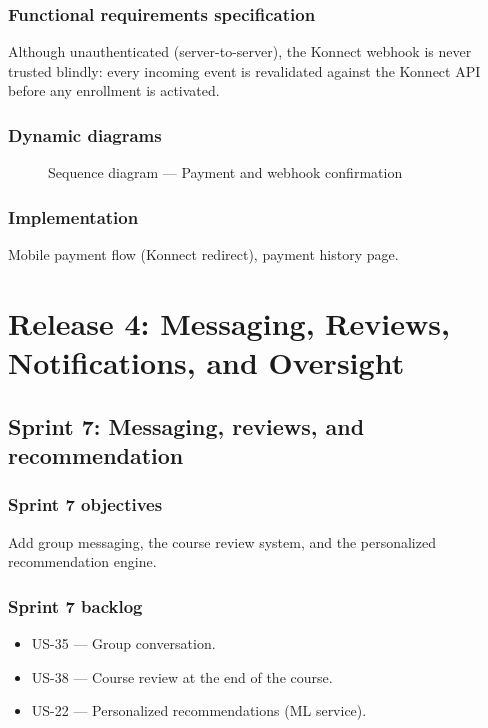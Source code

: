 \documentclass[a4paper,12pt]{report}
\begin{document}
\subsection{Functional requirements specification}
Although unauthenticated (server-to-server), the Konnect webhook is never
trusted blindly: every incoming event is revalidated against the Konnect
API before any enrollment is activated.

\subsection{Dynamic diagrams}
\begin{figure}[H]
\centering
\caption{Sequence diagram --- Payment and webhook confirmation}
\end{figure}

\subsection{Implementation}
Mobile payment flow (Konnect redirect), payment history page.

\chapter{Release 4: Messaging, Reviews, Notifications, and Oversight}

\section{Sprint 7: Messaging, reviews, and recommendation}

\subsection{Sprint 7 objectives}
Add group messaging, the course review system, and the personalized
recommendation engine.

\subsection{Sprint 7 backlog}
\begin{itemize}[leftmargin=*]
  \item US-35 --- Group conversation.
  \item US-38 --- Course review at the end of the course.
  \item US-22 --- Personalized recommendations (ML service).
\end{itemize}
\end{document}
